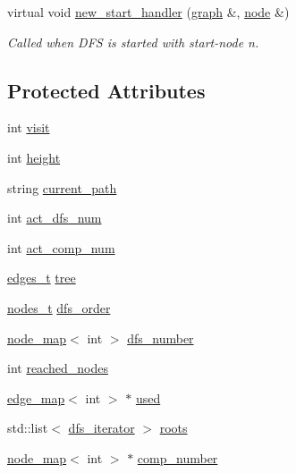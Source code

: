 \begin{DoxyCompactItemize}
virtual void \mbox{\hyperlink{classdfs_a304b14458fb78f9feb3d8d5683d3cab5}{new\+\_\+start\+\_\+handler}} (\mbox{\hyperlink{classgraph}{graph}} \&, \mbox{\hyperlink{classnode}{node}} \&)
\begin{DoxyCompactList}\small\item\em Called when D\+FS is started with start-\/node {\itshape n}. \end{DoxyCompactList}\end{DoxyCompactItemize}
\subsection*{Protected Attributes}
\begin{DoxyCompactItemize}
\item 
int \mbox{\hyperlink{classmydfs_a6d8114b5e013781c2aee9729bbec09d6}{visit}}
\item 
int \mbox{\hyperlink{classmydfs_a4dfe98511fb86ff3cb365c20028cd1ae}{height}}
\item 
string \mbox{\hyperlink{classmydfs_a8b1c7457a3f24f71e12cfe8d8ee00d12}{current\+\_\+path}}
\item 
int \mbox{\hyperlink{classdfs_aedaf2b485ff83150b1de6c305922473b}{act\+\_\+dfs\+\_\+num}}
\item 
int \mbox{\hyperlink{classdfs_ab0251ac30adfd569e214a64db7f3a905}{act\+\_\+comp\+\_\+num}}
\item 
\mbox{\hyperlink{edge_8h_a8f9587479bda6cf612c103494b3858e3}{edges\+\_\+t}} \mbox{\hyperlink{classdfs_aed496b618a937723bfec0b463e17e8d5}{tree}}
\item 
\mbox{\hyperlink{edge_8h_a22ac17689106ba21a84e7bc54d1199d6}{nodes\+\_\+t}} \mbox{\hyperlink{classdfs_af70a73ace68afd91ef944f984c9f28d5}{dfs\+\_\+order}}
\item 
\mbox{\hyperlink{classnode__map}{node\+\_\+map}}$<$ int $>$ \mbox{\hyperlink{classdfs_a99727f2274d6af63daae4f0518f3adbe}{dfs\+\_\+number}}
\item 
int \mbox{\hyperlink{classdfs_acb11186a1a2a2a1f38cdc0674340ba37}{reached\+\_\+nodes}}
\item 
\mbox{\hyperlink{classedge__map}{edge\+\_\+map}}$<$ int $>$ $\ast$ \mbox{\hyperlink{classdfs_afc18288747491be301d6d8d85d8f220b}{used}}
\item 
std\+::list$<$ \mbox{\hyperlink{classdfs_a15fe023a5a1f7ddda00f3d87110d9a32}{dfs\+\_\+iterator}} $>$ \mbox{\hyperlink{classdfs_a0bbd5cb8df26c891b74dadd84b46a06b}{roots}}
\item 
\mbox{\hyperlink{classnode__map}{node\+\_\+map}}$<$ int $>$ $\ast$ \mbox{\hyperlink{classdfs_a00db016ac7eab69045cae408008890c1}{comp\+\_\+number}}

\end{DoxyCompactItemize}
